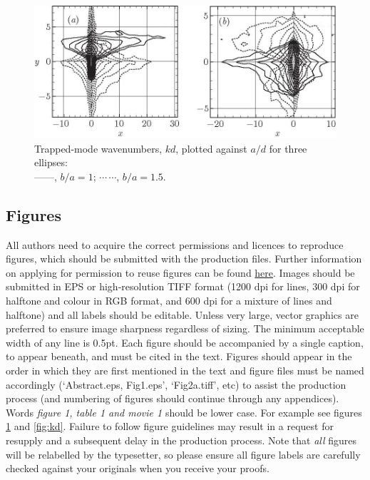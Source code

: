 \documentclass[lineno]{jfm}
\begin{document}
\begin{figure}
  \centerline{\includegraphics{Fig1}}%
  \caption{Trapped-mode wavenumbers, $kd$, plotted against $a/d$ for
    three ellipses:\protect\\
    ---$\!$---,
    $b/a=1$; $\cdots$\,$\cdots$, $b/a=1.5$.}
\label{fig:ka}
\end{figure}


\subsection{Figures}
 All authors need to acquire the correct permissions and licences to reproduce figures, which should be submitted with the production files. Further information on applying for permission to reuse figures can be found \href{https://www.cambridge.org/core/journals/journal-of-fluid-mechanics/information/request-permissions}{here}.  Images should be submitted in EPS or high-resolution TIFF format (1200 dpi for lines, 300 dpi for halftone and colour in RGB format, and 600 dpi for a mixture of lines and halftone) and all labels should be editable. Unless very large, vector graphics are preferred to ensure image sharpness regardless of sizing. The minimum acceptable width of any line is 0.5pt. Each figure should be accompanied by a single caption, to appear beneath, and must be cited in the text. Figures should appear in the order in which they are first mentioned in the text and figure files must be named accordingly (`Abstract.eps, Fig1.eps', `Fig2a.tiff', etc) to assist the production process (and numbering of figures should continue through any appendices). Words \textit {figure 1, table 1 and movie  1} should be lower case. For example see figures \ref{fig:ka} and \ref{fig:kd}.
 Failure to follow figure guidelines may result in a request for resupply and a subsequent delay in the production process. Note that {\em all} figures will be relabelled by the typesetter, so please ensure all figure labels are carefully checked against your originals when you receive your proofs.
\end{document}
